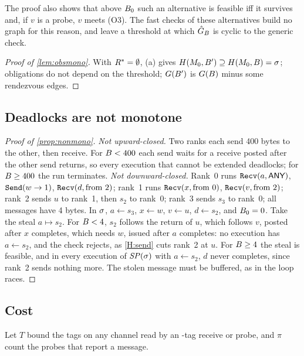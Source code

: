 \noindent The proof also shows that above $B_0$ such an alternative is feasible iff it
survives and, if $v$ is a probe, $v$ meets (O3). The fast checks of these alternatives build
no graph for this reason, and leave a threshold at which $\hat G_B$ is cyclic to the generic
check.

\begin{proof}[Proof of \cref{lem:obsmono}]
With $R^{*}=\emptyset$, (a) gives $H(M_0,B')\supseteq H(M_0,B)=\sigma$;
obligations do not depend on the threshold; $G(B')$ is $G(B)$ minus some
rendezvous edges.
\end{proof}

\subsection{Deadlocks are not monotone}
\label{app:nonmono}

\begin{proof}[Proof of \cref{prop:nonmono}]
\emph{Not upward-closed.} Two ranks each send 400 bytes to the other, then receive. For
$B<400$ each send waits for a receive posted after the other send returns, so every execution
that cannot be extended deadlocks; for $B\ge400$ the run terminates.
\emph{Not downward-closed.} Rank~0 runs $\texttt{Recv}(a,\textsf{ANY})$, $\texttt{Send}(w\to1)$,
$\texttt{Recv}(d,\text{from }2)$; rank~1 runs $\texttt{Recv}(x,\text{from }0)$,
$\texttt{Recv}(v,\text{from }2)$; rank~2 sends $u$ to rank~1, then $s_2$ to rank~0; rank~3
sends $s_3$ to rank~0; all messages have 4 bytes. In $\sigma$, $a\gets s_3$, $x\gets w$,
$v\gets u$, $d\gets s_2$, and $B_0=0$. Take the steal $a\mapsto s_2$. For $B<4$, $s_2$
follows the return of $u$, which follows $v$, posted after $x$ completes, which needs $w$,
issued after $a$ completes: no execution has $a\gets s_2$, and the check rejects, as
\ref{H:send} cuts rank~2 at $u$. For $B\ge4$ the steal is feasible, and in every execution of
$\mathit{SP}(\sigma)$ with $a\gets s_2$, $d$ never completes, since rank~2 sends nothing more. The
stolen message must be buffered, as in the \MBI loop races.
\end{proof}

\subsection{Cost}
\label{app:cost}

Let $T$ bound the tags on any channel read by an \ANY-tag receive or probe, and $\pi$ count the
probes that report a message.

